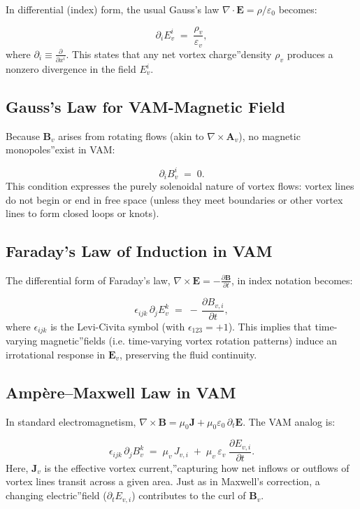 \documentclass[a4paper,12pt]{article}
\begin{document}
In differential (index) form, the usual Gauss's law \(\nabla\cdot\mathbf{E} = \rho/\varepsilon_0\) becomes:

\[
    \partial_i E_{v}^i
    \;=\;
    \frac{\rho_v}{\varepsilon_v},
    \tag{1}
\]
where \(\partial_i \equiv \frac{\partial}{\partial x^i}\). This states that any net vortex \grqq charge\textquotedblright density \(\rho_v\) produces a nonzero divergence in the field \(E_{v}^i\).

\subsection{Gauss's Law for VAM-Magnetic Field}

Because \(\mathbf{B}_v\) arises from rotating flows (akin to \(\nabla\times \mathbf{A}_v\)), no \grqq magnetic monopoles\textquotedblright exist in VAM:

\[
    \partial_i B_{v}^i
    \;=\; 0.
    \tag{2}
\]
This condition expresses the purely solenoidal nature of vortex flows: vortex lines do not begin or end in free space (unless they meet boundaries or other vortex lines to form closed loops or knots).

\subsection{Faraday's Law of Induction in VAM}

The differential form of Faraday's law, \(\nabla\times \mathbf{E} = -\frac{\partial \mathbf{B}}{\partial t}\), in index notation becomes:

\[
    \epsilon_{ijk}\,\partial_j E_{v}^k
    \;=\;
    -\,\frac{\partial B_{v,i}}{\partial t},
    \tag{3}
\]
where \(\epsilon_{ijk}\) is the Levi-Civita symbol (with \(\epsilon_{123} = +1\)). This implies that time-varying \grqq magnetic\textquotedblright fields (i.e. time-varying vortex rotation patterns) induce an irrotational response in \(\mathbf{E}_v\), preserving the fluid continuity.

\subsection{Ampère--Maxwell Law in VAM}

In standard electromagnetism, \(\nabla\times \mathbf{B} = \mu_0 \mathbf{J} + \mu_0\varepsilon_0\,\partial_t\mathbf{E}\). The VAM analog is:

\[
    \epsilon_{ijk}\,\partial_j B_{v}^k
    \;=\;
    \mu_v\,J_{v,i}
    \;+\;
    \mu_v\,\varepsilon_v\;\frac{\partial E_{v,i}}{\partial t}.
    \tag{4}
\]
Here, \(\mathbf{J}_v\) is the effective \grqq vortex current,\textquotedblright capturing how net inflows or outflows of vortex lines transit across a given area. Just as in Maxwell's correction, a changing \grqq electric\textquotedblright field (\(\partial_t E_{v,i}\)) contributes to the curl of \(\mathbf{B}_v\).
\end{document}
